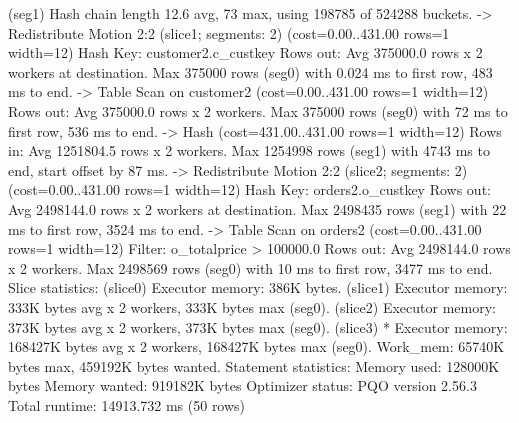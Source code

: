 \documentclass[a4paper,11pt]{report}
\begin{document}
\begin{sqlcode}
                           (seg1)   Hash chain length 12.6 avg, 73 max, using 198785 of 524288 buckets.
                           ->  Redistribute Motion 2:2  (slice1; segments: 2)  (cost=0.00..431.00 rows=1 width=12)
                                 Hash Key: customer2.c_custkey
                                 Rows out:  Avg 375000.0 rows x 2 workers at destination.  Max 375000 rows (seg0) with 0.024 ms to first row, 483 ms to end.
                                 ->  Table Scan on customer2  (cost=0.00..431.00 rows=1 width=12)
                                       Rows out:  Avg 375000.0 rows x 2 workers.  Max 375000 rows (seg0) with 72 ms to first row, 536 ms to end.
                           ->  Hash  (cost=431.00..431.00 rows=1 width=12)
                                 Rows in:  Avg 1251804.5 rows x 2 workers.  Max 1254998 rows (seg1) with 4743 ms to end, start offset by 87 ms.
                                 ->  Redistribute Motion 2:2  (slice2; segments: 2)  (cost=0.00..431.00 rows=1 width=12)
                                       Hash Key: orders2.o_custkey
                                       Rows out:  Avg 2498144.0 rows x 2 workers at destination.  Max 2498435 rows (seg1) with 22 ms to first row, 3524 ms to end.
                                       ->  Table Scan on orders2  (cost=0.00..431.00 rows=1 width=12)
                                             Filter: o_totalprice > 100000.0
                                             Rows out:  Avg 2498144.0 rows x 2 workers.  Max 2498569 rows (seg0) with 10 ms to first row, 3477 ms to end.
 Slice statistics:
   (slice0)    Executor memory: 386K bytes.
   (slice1)    Executor memory: 333K bytes avg x 2 workers, 333K bytes max (seg0).
   (slice2)    Executor memory: 373K bytes avg x 2 workers, 373K bytes max (seg0).
   (slice3)  * Executor memory: 168427K bytes avg x 2 workers, 168427K bytes max (seg0).  Work_mem: 65740K bytes max, 459192K bytes wanted.
 Statement statistics:
   Memory used: 128000K bytes
   Memory wanted: 919182K bytes
 Optimizer status: PQO version 2.56.3
 Total runtime: 14913.732 ms
(50 rows)
\end{sqlcode}
\end{document}
